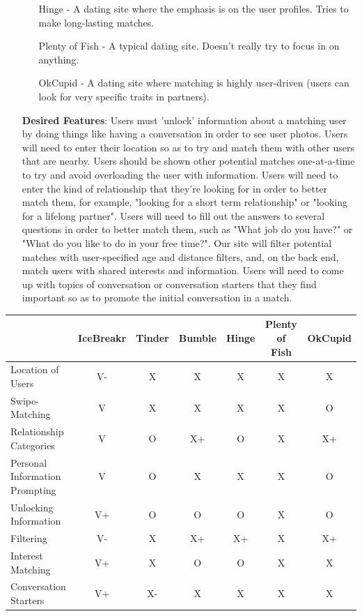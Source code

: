 \documentclass{article}
\begin{document}
\begin{enumerate}
\begin{enumerate}
                \item[Hinge -]
                A dating site where the emphasis is on the user profiles. Tries to make long-lasting matches.\\
                
                \item[Plenty of Fish -]
                A typical dating site. Doesn't really try to focus in on anything.\\
                
                \item[OkCupid -]
                A dating site where matching is highly user-driven (users can look for very specific traits in partners).\\
            \end{enumerate}
        
        \item[\textbf{Desired Features}:]
        Users must 'unlock' information about a matching user by doing things like having a conversation in order to see user photos. Users will need to enter their location so as to try and match them with other users that are nearby. Users should be shown other potential matches one-at-a-time to try and avoid overloading the user with information. Users will need to enter the kind of relationship that they're looking for in order to better match them, for example, "looking for a short term relationship" or "looking for a lifelong partner". Users will need to fill out the answers to several questions in order to better match them, such as "What job do you have?" or "What do you like to do in your free time?". Our site will filter potential matches with user-specified age and distance filters, and, on the back end, match users with shared interests and information. Users will need to come up with topics of conversation or conversation starters that they find important so as to promote the initial conversation in a match.\\
    \end{enumerate}
    \hspace{-2cm}\begin{tabular}{|l|c|c|c|c|c|c|}
        \hline
         & IceBreakr & Tinder & Bumble & Hinge & Plenty of Fish & OkCupid \\
         \hline
         Location of Users & V- & X & X & X & X & X \\
         \hline
         Swipe-Matching & V & X & X & X & X & O \\
         \hline
         Relationship Categories & V & O & X+ & O & X & X+ \\
         \hline
         Personal Information Prompting & V & O & X & X & X & O \\
         \hline
         Unlocking Information & V+ & O & O & O & X & O \\
         \hline
         Filtering & V- & X & X+ & X+ & X & X+ \\
         \hline
         Interest Matching & V+ & X & O & O & X & X \\
         \hline
         Conversation Starters & V+ & X- & X & X & X & X \\
         \hline
    \end{tabular}
\end{document}
